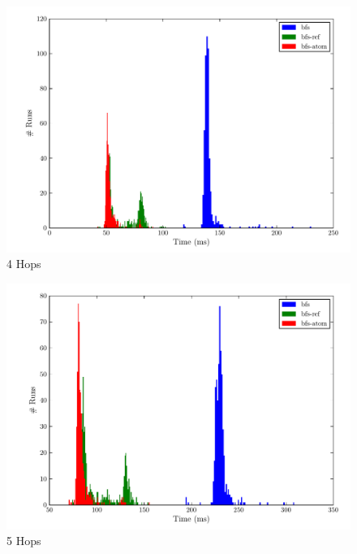 \documentclass[12pt,letterpaper,oneside,notitlepage]{report}
\theoremstyle{definition}
\begin{document}
		\begin{figure}[!ht]
			\centering
			\includegraphics[scale=0.85]{4_hops}
			\caption{4 Hops}
			\label{fig:perf-4-hops}
		\end{figure}
		
		\begin{figure}[!ht]
			\centering
			\includegraphics[scale=0.85]{5_hops}
			\caption{5 Hops}
			\label{fig:perf-5-hops}
		\end{figure}
		
\end{document}
